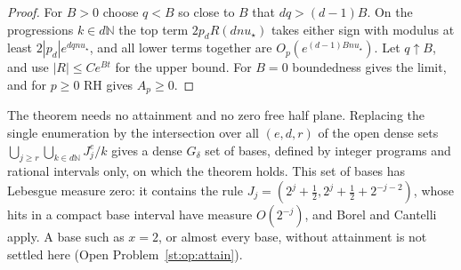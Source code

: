 \begin{proof}
For $B>0$ choose $q<B$ so close to $B$ that $dq>(d-1)B$. On the progressions $k\in d\mathbb N$ the top term $2p_dR(dnu_\star)$ takes either sign with modulus at least $2|p_d|e^{dqnu_\star}$, and all lower terms together are $O_p(e^{(d-1)Bnu_\star})$. Let $q\uparrow B$, and use $|R|\le Ce^{Bt}$ for the upper bound. For $B=0$ boundedness gives the limit, and for $p\ge0$ RH gives $A_p\ge0$.
\end{proof}
\begin{remark}\label{st:rem:category}
The theorem needs no attainment and no zero free half plane. Replacing the single enumeration by the intersection over all $(e,d,r)$ of the open dense sets $\bigcup_{j\ge r}\bigcup_{k\in d\mathbb N}J^e_j/k$ gives a dense $G_\delta$ set of bases, defined by integer programs and rational intervals only, on which the theorem holds. This set of bases has Lebesgue measure zero: it contains the rule $J_j=(2^j+\tfrac12,2^j+\tfrac12+2^{-j-2})$, whose hits in a compact base interval have measure $O(2^{-j})$, and Borel and Cantelli apply. A base such as $x=2$, or almost every base, without attainment is not settled here (Open Problem~\ref{st:op:attain}).
\end{remark}

